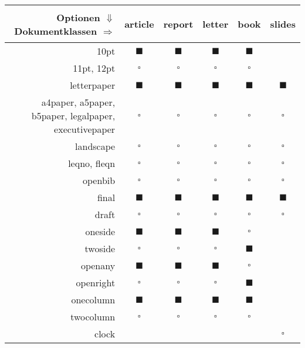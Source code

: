 \begin{table}[htbp]
	\begin{center}
		\begin{tabular}{r|c|c|c|c|c}
			Optionen $\Downarrow$ Dokumentklassen $\Rightarrow$ &
			\begin{sideways} article \end{sideways} &
			\begin{sideways} report \end{sideways} &
			\begin{sideways} letter \end{sideways} &
			\begin{sideways} book \end{sideways} &
			\begin{sideways} slides \end{sideways}
			\\ \hline
			10pt &
			$\blacksquare$ &
			$\blacksquare$ &
			$\blacksquare$ &
			$\blacksquare$ &
			\\ \hline
			11pt, 12pt &
			$\square$ &
			$\square$ &
			$\square$ &
			$\square$ &
			\\ \hline
			letterpaper &
			$\blacksquare$ &
			$\blacksquare$ &
			$\blacksquare$ &
			$\blacksquare$ &
			$\blacksquare$ \\ \hline
			a4paper, a5paper, b5paper, legalpaper, executivepaper &
			$\square$ &
			$\square$ &
			$\square$ &
			$\square$ &
			$\square$ \\ \hline
			landscape &
			$\square$ &
			$\square$ &
			$\square$ &
			$\square$ &
			$\square$ \\ \hline
			leqno, fleqn &
			$\square$ &
			$\square$ &
			$\square$ &
			$\square$ &
			$\square$ \\ \hline
			openbib &
			$\square$ &
			$\square$ &
			$\square$ &
			$\square$ &
			$\square$ \\ \hline
			final &
			$\blacksquare$ &
			$\blacksquare$ &
			$\blacksquare$ &
			$\blacksquare$ &
			$\blacksquare$ \\ \hline
			draft &
			$\square$ &
			$\square$ &
			$\square$ &
			$\square$ &
			$\square$ \\ \hline
			oneside &
			$\blacksquare$ &
			$\blacksquare$ &
			$\blacksquare$ &
			$\square$ &
			\\ \hline
			twoside &
			$\square$ &
			$\square$ &
			$\square$ &
			$\blacksquare$ &
			\\ \hline
			openany &
			$\blacksquare$ &
			$\blacksquare$ &
			$\blacksquare$ &
			$\square$ &
			\\ \hline
			openright &
			$\square$ &
			$\square$ &
			$\square$ &
			$\blacksquare$ &
			\\ \hline
			onecolumn &
			$\blacksquare$ &
			$\blacksquare$ &
			$\blacksquare$ &
			$\blacksquare$ &
			\\ \hline
			twocolumn &
			$\square$ &
			$\square$ &
			$\square$ &
			$\square$ &
			\\ \hline
			clock & & & & & $\square$ \\
		\end{tabular}
	\end{center}


\end{table}
